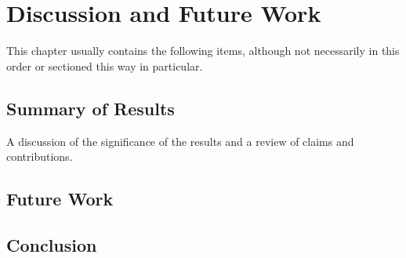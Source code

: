 %
%
%

\chapter{Discussion and Future Work}\label{ch:conclusion}

This chapter usually contains the following items, although not
necessarily in this order or sectioned this way in particular.

\section{Summary of Results}
A discussion of the significance of the results
and a review of claims and contributions.

\section{Future Work}

\section{Conclusion}
